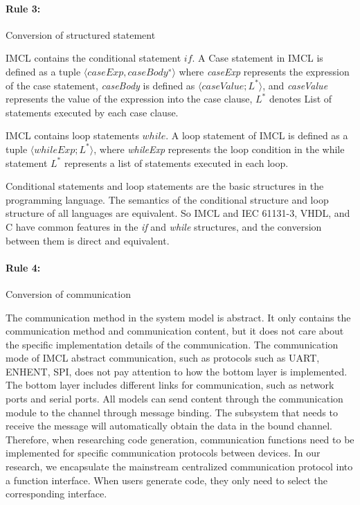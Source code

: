 \paragraph{\textbf{Rule 3: }} Conversion of structured statement

IMCL contains the conditional statement $if$. A Case statement in IMCL is defined as a tuple $\langle caseExp, caseBody^{∗} \rangle$ where \emph{caseExp} represents the expression of the case statement, \emph{caseBody} is defined as $\langle caseValue; L^* \rangle$, and \emph{caseValue} represents the value of the expression into the case clause, $L^*$ denotes List of statements executed by each case clause.

IMCL contains loop statements $while$. A loop statement of IMCL is defined as a tuple $\langle whileExp; L^* \rangle$, where \emph{whileExp} represents the loop condition in the while statement $L^*$ represents a list of statements executed in each loop.

Conditional statements and loop statements are the basic structures in the programming language. The semantics of the conditional structure and loop structure of all languages are equivalent. So IMCL and IEC 61131-3, VHDL, and C have common features in the \emph{if} and \emph{while} structures, and the conversion between them is direct and equivalent.


\paragraph{\textbf{Rule 4: }} Conversion of communication

The communication method in the system model is abstract. It only contains the communication method and communication content, but it does not care about the specific implementation details of the communication. The communication mode of IMCL abstract communication, such as protocols such as UART, ENHENT, SPI, does not pay attention to how the bottom layer is implemented. The bottom layer includes different links for communication, such as network ports and serial ports. All models can send content through the communication module to the channel through message binding. The subsystem that needs to receive the message will automatically obtain the data in the bound channel. Therefore, when researching code generation, communication functions need to be implemented for specific communication protocols between devices. In our research, we encapsulate the mainstream centralized communication protocol into a function interface. When users generate code, they only need to select the corresponding interface.

